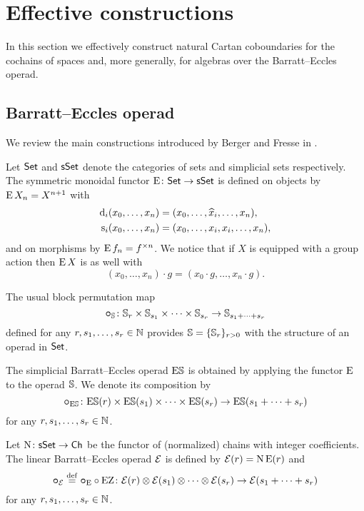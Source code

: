
\section{Effective constructions}

In this section we effectively construct natural Cartan coboundaries for the cochains of spaces and, more generally, for algebras over the Barratt--Eccles operad.

\subsection{Barratt--Eccles operad}

We review the main constructions introduced by Berger and Fresse in \cite{berger2004combinatorial}.

Let $\mathsf{Set}$ and $\mathsf{sSet}$ denote the categories of sets and simplicial sets respectively.
The symmetric monoidal functor $\operatorname{E} \colon \mathsf{Set} \to \mathsf{sSet}$ is defined on objects by $\operatorname{E} X_n = X^{n+1}$ with
\[
\begin{split}
	\operatorname{d}_i(x_0,\dots,x_n) &= (x_0,\dots,\widehat{x}_i,\dots,x_n), \\
	\operatorname{s}_i(x_0,\dots,x_n) &= (x_0, \dots, x_i, x_i, \dots, x_n),
\end{split}
\]
and on morphisms by $\operatorname{E} f_n = f^{\times n}$.
We notice that if $X$ is equipped with a group action then $\operatorname{E} X$ is as well with
\[
(x_0,\dots,x_n) \cdot g = (x_0 \cdot g, \dots, x_n \cdot g).
\]

The usual block permutation map
\[
\bm{\circ}_{\mathbb{S}} \colon \mathbb{S}_r \times \mathbb{S}_{s_1} \times \cdots \times \mathbb{S}_{s_r} \to \mathbb{S}_{s_1+\dots+s_r}
\]
defined for any $r,s_1,\dots,s_r \in \mathbb{N}$ provides $\mathbb{S} = \{\mathbb{S}_r\}_{r>0}$ with the structure of an operad in $\mathsf{Set}$.

The simplicial Barratt--Eccles operad $\mathrm{E}\mathbb{S}$ is obtained by applying the functor $\operatorname{E}$ to the operad $\mathbb{S}$.
We denote its composition by
\[
\bm{\circ}_{\mathrm{E}\mathbb{S}} \colon \mathrm{E}\mathbb{S}(r) \times \mathrm{E}\mathbb{S}(s_1) \times\dots\times \mathrm{E}\mathbb{S}(s_r) \to \mathrm{E}\mathbb{S}(s_1+\dots+s_r)
\]
for any $r,s_1,\dots,s_r \in \mathbb{N}$.

Let $\operatorname{N} \colon \mathsf{sSet} \to \mathsf{Ch}$ be the functor of (normalized) chains with integer coefficients.
The linear Barratt--Eccles operad $\mathcal{E}$ is defined by $\mathcal{E}(r) = \operatorname{N}\operatorname{E}(r)$ and
\[
\bm{\circ}_{\mathcal{E}} \stackrel{\mathrm{def}}{=} \bm{\circ}_{\operatorname{E}} \circ \operatorname{EZ} \colon \mathcal{E}(r) \otimes \mathcal{E}(s_1) \otimes\dotsb\otimes \mathcal{E}(s_r) \to \mathcal{E}(s_1+\dots+s_r)
\]
for any $r,s_1,\dots,s_r \in \mathbb{N}$.

